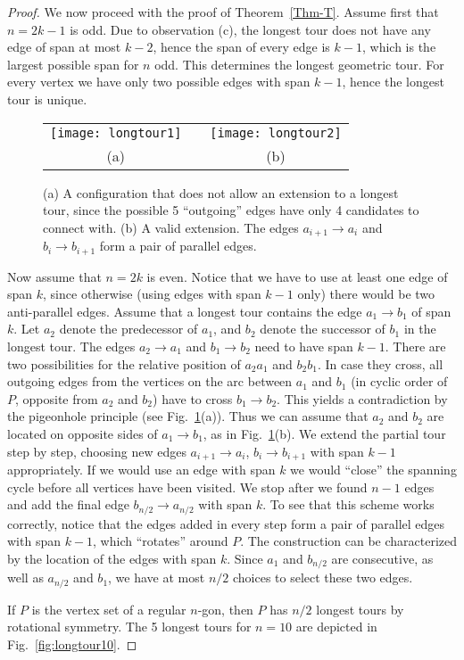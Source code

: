 \documentclass[11pt]{article}
\newcommand{\ar}{\rightarrow}
\begin{document}
\begin{proof}
\medskip
We now proceed with the proof of Theorem~\ref{Thm-T}. Assume first that $n=2k-1$ is odd. 
Due to observation (c), the longest tour does not have any edge of span at most $k-2$,
hence the span of every edge is $k-1$, which is the largest
possible span for $n$ odd. This determines the longest geometric tour.
For every vertex we have only two possible edges with span
$k-1$, hence the longest tour is unique.
\begin{figure}[htbp]
\begin{center}
\begin{tabular}{cp{15mm}c}
  \texttt{[image: longtour1]} & &
  \texttt{[image: longtour2]} \\
  (a) && (b)
\end{tabular}
\caption{(a) A configuration that does not allow an extension to a
longest tour, since the possible 5 ``outgoing'' edges have only 4
candidates to connect with. (b) A valid extension. The edges
$a_{i+1}\ar a_i$ and $b_i\ar b_{i+1}$ form a pair of parallel
edges.}
\label{fig:eventour}
\end{center}
\end{figure}

Now assume that $n=2k$ is even. Notice that we have to use at least one
edge of span $k$, since otherwise (using edges with span $k-1$ only)
there would be two anti-parallel edges. Assume that a longest tour
contains the edge $a_1\ar b_1$ of span $k$. Let $a_2$ denote the predecessor of $a_1$,
and $b_2$ denote the successor of $b_1$ in the longest tour. The edges $a_2\ar a_1$ and
$b_1\ar b_2$ need to have span $k-1$.
There are two possibilities for the relative position of $a_2a_1$ and $b_2b_1$.
In case they cross, all outgoing edges from the vertices on the arc
between $a_1$ and $b_1$ (in cyclic order of $P$, opposite from $a_2$ and $b_2$)
have to cross $b_1\ar b_2$. This yields a contradiction by
the pigeonhole principle (see Fig.~\ref{fig:eventour}(a)).
Thus we can assume that $a_2$ and $b_2$ are located on opposite sides of
$a_1\ar b_1$, as in Fig.~\ref{fig:eventour}(b). We extend the partial tour step by step,
choosing new edges $a_{i+1}\ar a_i$, $b_i\ar b_{i+1}$ with span $k-1$
appropriately. If we would use an edge with span $k$ we would
``close'' the spanning cycle before all vertices have been visited.
We stop after we found $n-1$ edges and add the final
edge $b_{n/2}\ar a_{n/2}$ with span $k$. To see that this scheme works
correctly, notice that the edges added in every step form a pair of
parallel edges with span $k-1$, which ``rotates'' around $P$. The
construction can be characterized by the location of the edges with
span $k$. Since $a_1$ and $b_{n/2}$ are consecutive, as well as
$a_{n/2}$ and $b_{1}$, we have at most $n/2$ choices to select these
two edges.


If $P$ is the vertex set of a regular $n$-gon, then $P$ has
$n/2$ longest tours by rotational symmetry. The 5 longest tours for
$n=10$ are depicted in Fig.~\ref{fig:longtour10}.
\end{proof}
\end{document}
